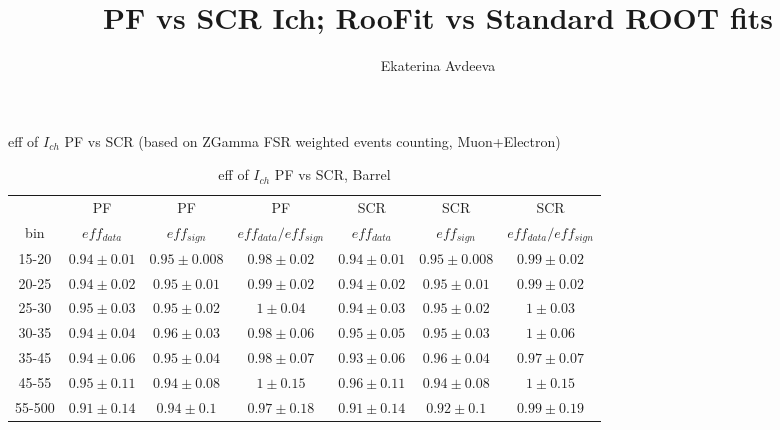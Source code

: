 \documentclass{beamer}
\title{PF vs SCR Ich; RooFit vs Standard ROOT fits}
\author{Ekaterina Avdeeva}
\institute{University of Nebraska - Lincoln}
\begin{document}
\begin{frame}
\titlepage
\end{frame}

\begin{frame}{eff of $I_{ch}$ PF vs SCR (based on ZGamma FSR weighted events counting, Muon+Electron)}
{

\begin{table}[h]
  \tiny
  \begin{center}
  \caption{ eff of $I_{ch}$ PF vs SCR, Barrel}
  \begin{tabular}{|c|c|c|c|c|c|c|}
 & PF & PF & PF & SCR & SCR & SCR \\
 bin & $eff_{data}$ & $eff_{sign}$ & $eff_{data}/eff_{sign}$ & $eff_{data}$ & $eff_{sign}$ & $eff_{data}/eff_{sign}$ \\ \hline
15-20 &  $0.94\pm0.01$  &  $0.95\pm0.008$  &  $0.98\pm0.02$  &  $0.94\pm0.01$  &  $0.95\pm0.008$  &  $0.99\pm0.02$  \\ \hline 
20-25 &  $0.94\pm0.02$  &  $0.95\pm0.01$  &  $0.99\pm0.02$  &  $0.94\pm0.02$  &  $0.95\pm0.01$  &  $0.99\pm0.02$  \\ \hline 
25-30 &  $0.95\pm0.03$  &  $0.95\pm0.02$  &  $1\pm0.04$  &  $0.94\pm0.03$  &  $0.95\pm0.02$  &  $1\pm0.03$  \\ \hline 
30-35 &  $0.94\pm0.04$  &  $0.96\pm0.03$  &  $0.98\pm0.06$  &  $0.95\pm0.05$  &  $0.95\pm0.03$  &  $1\pm0.06$  \\ \hline 
35-45 &  $0.94\pm0.06$  &  $0.95\pm0.04$  &  $0.98\pm0.07$  &  $0.93\pm0.06$  &  $0.96\pm0.04$  &  $0.97\pm0.07$  \\ \hline 
45-55 &  $0.95\pm0.11$  &  $0.94\pm0.08$  &  $1\pm0.15$  &  $0.96\pm0.11$  &  $0.94\pm0.08$  &  $1\pm0.15$  \\ \hline 
55-500 &  $0.91\pm0.14$  &  $0.94\pm0.1$  &  $0.97\pm0.18$  &  $0.91\pm0.14$  &  $0.92\pm0.1$  &  $0.99\pm0.19$  \\ \hline 
  \end{tabular}
  \label{tab:sf_PFvsSCR_Barrel}
  \end{center}
\end{table}

}
\end{frame}
\end{document}
